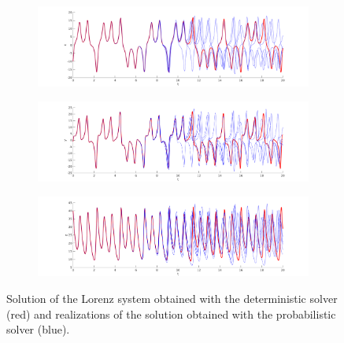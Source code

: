 \begin{figure}[t]
	\centering
	\begin{subfigure}{1\linewidth}
		\includegraphics[width=1\linewidth]{plots/Lorenz_x.png}
	\end{subfigure}
	\begin{subfigure}{1\linewidth}
		\includegraphics[width=1\linewidth]{plots/Lorenz_y.png}
	\end{subfigure}
	\begin{subfigure}{1\linewidth}
		\includegraphics[width=1\linewidth]{plots/Lorenz_z.png}
	\end{subfigure}
	\caption{Solution of the Lorenz system obtained with the deterministic solver (red) and realizations of the solution obtained with the probabilistic solver (blue).}
	\label{fig:Lorenz}
\end{figure}
